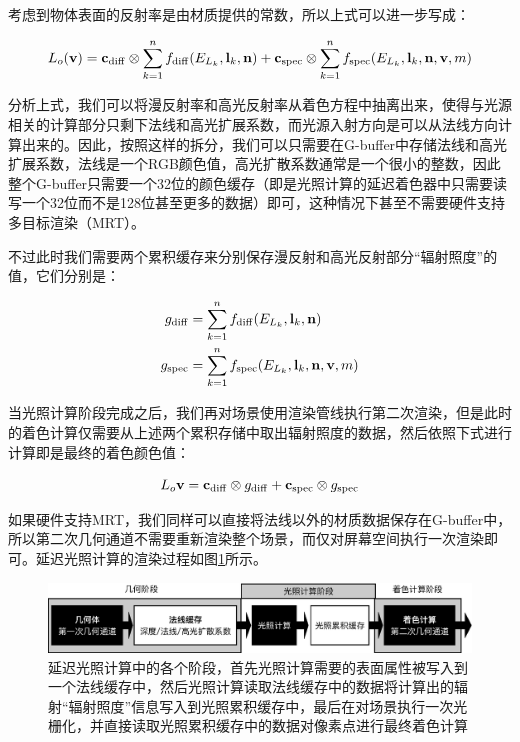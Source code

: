 \noindent 考虑到物体表面的反射率是由材质提供的常数，所以上式可以进一步写成：

\begin{equation}\label{eq:shade-deferred-lighting}
	L_o(\mathbf{v})=\mathbf{c}_{\rm diff}\otimes\sum^{n}_{k=1}f_{\rm diff}(E_{L_k},\mathbf{l}_k,\mathbf{n})+\mathbf{c}_{\rm spec}\otimes \sum^{n}_{k=1}f_{\rm spec}(E_{L_k},\mathbf{l}_k,\mathbf{n},\mathbf{v},m)
\end{equation}

分析上式，我们可以将漫反射率和高光反射率从着色方程中抽离出来，使得与光源相关的计算部分只剩下法线和高光扩展系数，而光源入射方向是可以从法线方向计算出来的。因此，按照这样的拆分，我们可以只需要在G-buffer中存储法线和高光扩展系数，法线是一个RGB颜色值，高光扩散系数通常是一个很小的整数，因此整个G-buffer只需要一个32位的颜色缓存（即是光照计算的延迟着色器中只需要读写一个32位而不是128位甚至更多的数据）即可，这种情况下甚至不需要硬件支持多目标渲染（MRT）。

不过此时我们需要两个累积缓存来分别保存漫反射和高光反射部分“辐射照度”的值，它们分别是：

\begin{equation}
\begin{aligned}
	g_{\rm diff}&=\sum^{n}_{k=1}f_{\rm diff}(E_{L_k},\mathbf{l}_k,\mathbf{n})\\
	g_{\rm spec}&=\sum^{n}_{k=1}f_{\rm spec}(E_{L_k},\mathbf{l}_k,\mathbf{n},\mathbf{v},m)
\end{aligned}
\end{equation}

当光照计算阶段完成之后，我们再对场景使用渲染管线执行第二次渲染，但是此时的着色计算仅需要从上述两个累积存储中取出辐射照度的数据，然后依照下式进行计算即是最终的着色颜色值：

\begin{equation}
	L_o{\mathbf{v}}=\mathbf{c}_{\rm diff}\otimes g_{\rm diff}+\mathbf{c}_{\rm spec}\otimes g_{\rm spec}
\end{equation}

如果硬件支持MRT，我们同样可以直接将法线以外的材质数据保存在G-buffer中，所以第二次几何通道不需要重新渲染整个场景，而仅对屏幕空间执行一次渲染即可。延迟光照计算的渲染过程如图\ref{f:shade-deferred-lighting}所示。

\begin{figure}
\begin{fullwidth}
	\includegraphics[width=\thewidth]{figures/shade/deferred-lighting}
	\caption{延迟光照计算中的各个阶段，首先光照计算需要的表面属性被写入到一个法线缓存中，然后光照计算读取法线缓存中的数据将计算出的辐射“辐射照度”信息写入到光照累积缓存中，最后在对场景执行一次光栅化，并直接读取光照累积缓存中的数据对像素点进行最终着色计算}
	\label{f:shade-deferred-lighting}
\end{fullwidth}
\end{figure}

